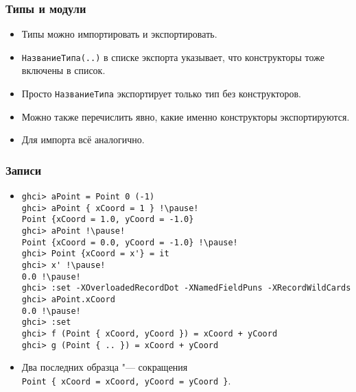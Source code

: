 \documentclass[10pt]{beamer}
\begin{document}
\begin{frame}[fragile]
  \frametitle{Типы и модули}
  \begin{itemize}
    \item Типы можно импортировать и экспортировать.
    \item \lstinline|НазваниеТипа(..)| в списке экспорта указывает, что конструкторы тоже включены в список.
    \item Просто \lstinline|НазваниеТипа| экспортирует только тип без конструкторов.
    \item Можно также перечислить явно, какие именно конструкторы экспортируются.
    \item Для импорта всё аналогично.
  \end{itemize}
\end{frame}

\begin{frame}[fragile]
  \frametitle{Записи}\hypertarget{rec2}{}
  \hyperlink{rec1}{}
  \begin{itemize}
    \item
          \begin{lstlisting}[basicstyle=\ttfamily\footnotesize]
ghci> aPoint = Point 0 (-1)
ghci> aPoint { xCoord = 1 } !\pause!
Point {xCoord = 1.0, yCoord = -1.0}
ghci> aPoint !\pause!
Point {xCoord = 0.0, yCoord = -1.0} !\pause!
ghci> Point {xCoord = x'} = it
ghci> x' !\pause!
0.0 !\pause!
ghci> :set -XOverloadedRecordDot -XNamedFieldPuns -XRecordWildCards
ghci> aPoint.xCoord
0.0 !\pause!
ghci> :set 
ghci> f (Point { xCoord, yCoord }) = xCoord + yCoord
ghci> g (Point { .. }) = xCoord + yCoord
\end{lstlisting}
    \item Два последних образца "--- сокращения\\ \lstinline[basicstyle=\ttfamily\small]|Point { xCoord = xCoord, yCoord = yCoord }|.
  \end{itemize}
\end{frame}
\end{document}
